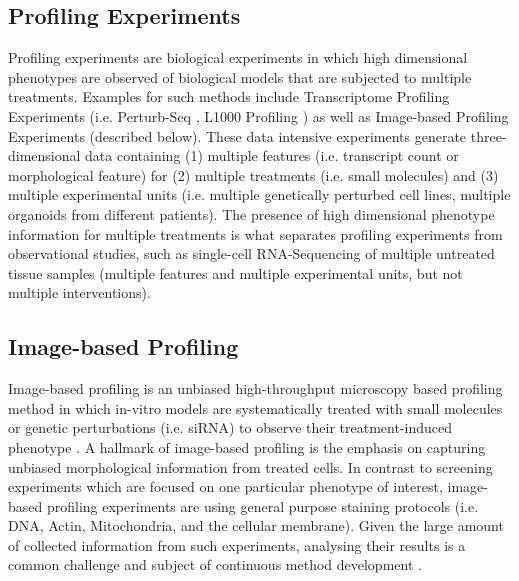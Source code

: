 \begin{flushleft}
\section{Profiling Experiments} 

Profiling experiments are biological experiments in which high dimensional phenotypes are observed of biological models that are subjected to multiple treatments. Examples for such methods include Transcriptome Profiling Experiments (i.e. Perturb-Seq \citep{dixitPerturbSeqDissectingMolecular2016}, L1000 Profiling \citep{subramanianNextGenerationConnectivity2017}) as well as Image-based Profiling Experiments \citep{caicedoApplicationsImagebasedProfiling2016} (described below). These data intensive experiments generate three-dimensional data containing (1) multiple features (i.e. transcript count or morphological feature) for (2) multiple treatments (i.e. small molecules) and (3) multiple experimental units (i.e. multiple genetically perturbed cell lines, multiple organoids from different patients). The presence of high dimensional phenotype information for multiple treatments is what separates profiling experiments from observational studies, such as single-cell RNA-Sequencing of multiple untreated tissue samples (multiple features and multiple experimental units, but not multiple interventions). 

\subsection{Image-based Profiling}

Image-based profiling is an unbiased high-throughput microscopy based profiling method in which in-vitro models are systematically treated with small molecules or genetic perturbations (i.e. siRNA) to observe their treatment-induced phenotype \citep{caicedoApplicationsImagebasedProfiling2016}. A hallmark of image-based profiling is the emphasis on capturing unbiased morphological information from treated cells. In contrast to screening experiments which are focused on one particular phenotype of interest, image-based profiling experiments are using general purpose staining protocols (i.e. DNA, Actin, Mitochondria, and the cellular membrane). Given the large amount of collected information from such experiments, analysing their results is a common challenge and subject of continuous method development \citep{chandrasekaranImagebasedProfilingDrug2021}. 
\par


\end{flushleft}
